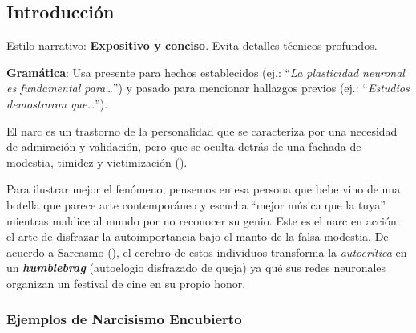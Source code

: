 \documentclass[
  10pt]{article}
\begin{document}
\newpage
\printacronyms[name=Abreviaturas]    

\newpage


\newpage



\newpage
{}
\subsection{Introducción}\label{sec-intro}

\begin{tcolorbox}[enhanced jigsaw, colframe=quarto-callout-tip-color-frame, bottomtitle=1mm, toptitle=1mm, left=2mm, arc=.35mm, toprule=.15mm, colback=white, coltitle=black, leftrule=.75mm, breakable, opacityback=0, titlerule=0mm, title=\textcolor{quarto-callout-tip-color}{\faLightbulb}\hspace{0.5em}{Tip}, rightrule=.15mm, opacitybacktitle=0.6, bottomrule=.15mm, colbacktitle=quarto-callout-tip-color!10!white]

Estilo narrativo: \textbf{Expositivo y conciso}. Evita detalles técnicos
profundos.

\textbf{Gramática}: Usa presente para hechos establecidos (ej.:
``\emph{La plasticidad neuronal es fundamental para\ldots{}}'') y pasado
para mencionar hallazgos previos (ej.: ``\emph{Estudios demostraron
que\ldots{}}'').

\end{tcolorbox}

El \ac{narc} es un trastorno de la personalidad que se caracteriza por
una necesidad de admiración y validación, pero que se oculta detrás de
una fachada de modestia, timidez y victimización
().

Para ilustrar mejor el fenómeno, pensemos en esa persona que bebe vino
de una botella que parece arte contemporáneo y escucha ``mejor música
que la tuya'' mientras maldice al mundo por no reconocer su genio. Este
es el \ac{narc}  en
acción: el arte de disfrazar la autoimportancia bajo el manto de la
falsa modestia. De acuerdo a Sarcasmo
(), el cerebro de estos
individuos transforma la \emph{autocrítica} en un
\textbf{\emph{humblebrag}} (autoelogio disfrazado de queja) ya qué sus
redes neuronales organizan un festival de cine en su propio honor.

\subsubsection{Ejemplos de Narcisismo
Encubierto}\label{ejemplos-de-narcisismo-encubierto}
\end{document}
